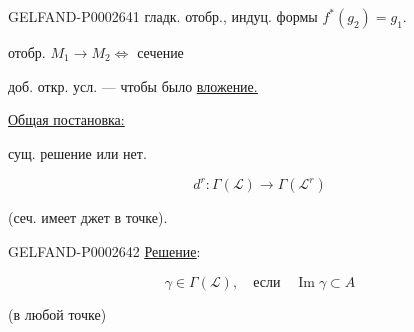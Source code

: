 \begin{GelfandAdjacentEvidence}{GELFAND-P000264}{1}
гладк. отобр., индуц. формы $f^*(g_2)=g_1$.





\end{GelfandAdjacentEvidence}


отобр. $M_1\to M_2\Leftrightarrow$ сечение





доб. откр. усл. --- чтобы было \underline{\underline{вложение.}}





\underline{Общая постановка:}

сущ. решение или нет.





\begin{equation*}
d^r:\Gamma(\mathcal L)\longrightarrow\Gamma(\mathcal L^r)
\end{equation*}

\hspace*{35mm}(сеч. имеет джет в точке).





\begin{GelfandAdjacentEvidence}{GELFAND-P000264}{2}
\underline{\underline{Решение}}:

\begin{equation*}
\gamma\in\Gamma(\mathcal L),\quad\text{если}\quad\operatorname{Im}\gamma\subset A
\end{equation*}

\hspace*{45mm}(в любой точке)

\end{GelfandAdjacentEvidence}


